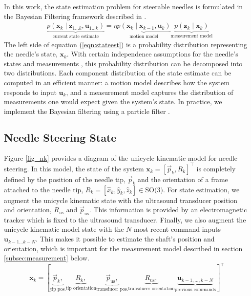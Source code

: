 \documentclass[journal,transmag]{IEEEtran}
\newcommand{\bvar}[2]{\mathbf{#1}_{#2}}
\newcommand{\stateest}[1][k]{p(\mathbf{x}_{#1} \mid \mathbf{z}_{1...#1},\mathbf{u}_{1...#1})}
\newcommand{\meas}[1][k]{p(\mathbf{z}_{#1} \mid \mathbf{x}_{#1})}
\newcommand{\motion}[1][k]{p(\mathbf{x}_{#1} \mid \mathbf{x}_{#1-1},\mathbf{u}_{#1})}
\newcommand{\usorientation}{R_{\text{us}}}
\newcommand{\uspos}{\vec{p}_{\text{us}}}
\begin{document}
In this work, the state estimation problem for steerable needles is formulated in the Bayesian Filtering framework described in \cite{Thrun:2005}.
\begin{align}  \label{eqn:stateest}
&\underbrace{\stateest}_{\text{current state estimate}} = \eta \underbrace{\motion}_{\text{motion model}} \underbrace{\meas}_{\text{measurement model}}
\end{align}
The left side of equation (\ref{eqn:stateest}) is a probability distribution representing the needle's state, $\bvar{x}{k}$.  With certain independence assumptions for the needle's states and measurements \cite{Thrun:2005}, this probability distribution can be decomposed into two distributions. Each component distribution of the state estimate can be computed in an efficient manner:  a motion model describes how the system responds to input $\bvar{u}{k}$, and a measurement model captures the distribution of measurements one would expect given the system's state.   In practice, we implement the Bayesian filtering using a particle filter \cite{Thrun:2005}.


\subsection{Needle Steering State} \label{subsec:state}
Figure \ref{fig_nk} provides a diagram of the unicycle kinematic model for needle steering.  In this model, the state of the system $\bvar{x}{k} =  \left[\vec{p}_k, R_k\right]^\top$ is completely defined by the position of the needle tip, $\vec{p}_k$ and the orientation of a frame attached to the needle tip, $R_k = \left[\hat{x}_k,\hat{y}_k,\hat{z}_k\right] \in \text{SO(3)}$.  For state estimation, we augment the unicycle kinematic state with the ultrasound transducer position and orientation, $\usorientation$ and $\uspos$.  This information is provided by an electromagnetic tracker which is fixed to the ultrasound transducer.  Finally,  we also augment the unicycle kinematic model state with the $N$ most recent command inputs $\bvar{u}{k-1...k-N}$.  This makes it possible to estimate the shaft's position and orientation, which is important for the measurement model described in section \ref{subsec:measurement} below.
\begin{dmath*}
\bvar{x}{k} =  \left[\underbrace{\vec{p}_k,}_{\text{tip pos.}} \underbrace{R_k,}_{\text{tip orientation}} \underbrace{\vec{p}_{\text{us}},}_{\text{transducer pos.}} \underbrace{R_{\text{us}},}_{\text{transducer orientation}} \underbrace{\bvar{u}{k-1,...,k-N}}_{\text{previous commands}}\right]^\top
\end{dmath*}
\end{document}
